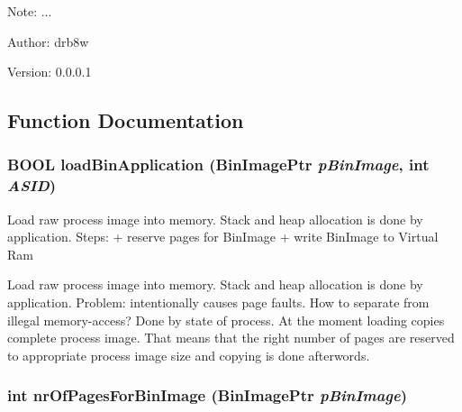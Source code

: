 \begin{Desc}
\item[Note:]... \end{Desc}
\begin{Desc}
\item[Author:]drb8w \end{Desc}
\begin{Desc}
\item[Version:]0.0.0.1 \end{Desc}


\subsection{Function Documentation}
\hypertarget{group___v_m_m___l_d_r_gaf0bee09e9416fef2ebaa23cd84c329b}{
\subsubsection[{loadBinApplication}]{\setlength{\rightskip}{0pt plus 5cm}BOOL loadBinApplication (BinImagePtr {\em pBinImage}, \/  int {\em ASID})}}
\label{group___v_m_m___l_d_r_gaf0bee09e9416fef2ebaa23cd84c329b}


Load raw process image into memory. Stack and heap allocation is done by application. Steps: + reserve pages for BinImage + write BinImage to Virtual Ram

Load raw process image into memory. Stack and heap allocation is done by application. Problem: intentionally causes page faults. How to separate from illegal memory-access? Done by state of process. At the moment loading copies complete process image. That means that the right number of pages are reserved to appropriate process image size and copying is done afterwords. \hypertarget{group___v_m_m___l_d_r_ga457b6bb7d7447760750e4315be37e14}{
\subsubsection[{nrOfPagesForBinImage}]{\setlength{\rightskip}{0pt plus 5cm}int nrOfPagesForBinImage (BinImagePtr {\em pBinImage})}}
\label{group___v_m_m___l_d_r_ga457b6bb7d7447760750e4315be37e14}


